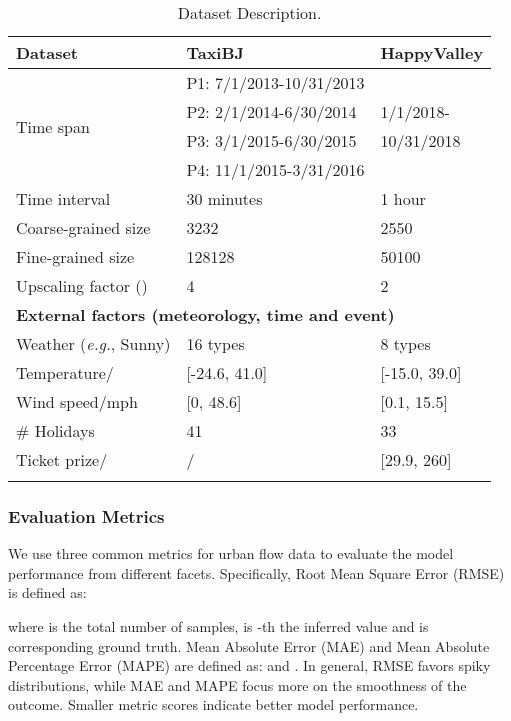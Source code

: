 \begin{table}[!h]
	\centering
	\caption{Dataset Description.}
	\vspace{-0.8em}
	\tabcolsep=1.2mm
	  \begin{tabular}{lll}
	  \shline
	  \textbf{Dataset} & \textbf{TaxiBJ} & \textbf{HappyValley} \\
	  \hline
	  \multirow{4}[1]{*}{Time span} & P1: 7/1/2013-10/31/2013 &  \\
			& P2: 2/1/2014-6/30/2014 & 1/1/2018- \\
			& P3: 3/1/2015-6/30/2015 & 10/31/2018 \\
			& P4: 11/1/2015-3/31/2016 &  \\
	  \midrule
	  Time interval & 30 minutes & 1 hour \\
	  Coarse-grained size & 3232 & 2550 \\
	  Fine-grained size & 128128 & 50100 \\
	  Upscaling factor () & 4     & 2 \\
	  \midrule
	  \multicolumn{3}{l}{\textbf{External factors (meteorology, time and event)}} \\
	  Weather (\emph{e.g.}, Sunny) & 16 types & 8 types \\
	  Temperature/\textcelsius & [-24.6, 41.0] & [-15.0, 39.0] \\
	  Wind speed/mph & [0, 48.6] & [0.1, 15.5] \\
	  \# Holidays & 41    & 33 \\
	  Ticket prize/\textyen  & /     & [29.9, 260] \\
	  \shline
	  \end{tabular}\label{tab:dataset}\end{table}



\subsubsection{Evaluation Metrics}

We use three common metrics for urban flow data to evaluate the model performance from different facets. Specifically, Root Mean Square Error (RMSE) is defined as:
 
where  is the total number of samples,  is -th the inferred value and  is corresponding ground truth. Mean Absolute Error (MAE) and Mean Absolute Percentage Error (MAPE) are defined as:  and . In general, RMSE favors spiky distributions, while MAE and MAPE focus more on the smoothness of the outcome. Smaller metric scores indicate better model performance.

